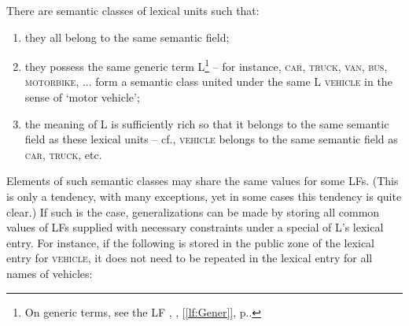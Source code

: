 There are semantic classes of lexical units such that:

\begin{enumerate}

\item they all belong to the same semantic field;

\item they possess the same generic term L\footnote{On generic terms, see the LF , , [\ref{lf:Gener}], p.\thinspace\pageref{lf:Gener}.} -- for instance, \textsc{car}, \textsc{truck}, \textsc{van}, \textsc{bus}, \textsc{motorbike}, ... form a semantic class united under the same L \textsc{vehicle} in the sense of `motor vehicle';

\item the meaning of L is sufficiently rich so that it belongs to the same semantic field as these lexical units -- cf., \textsc{vehicle} belongs to the same semantic field as \textsc{car}, \textsc{truck}, etc.

\end{enumerate}

Elements of such semantic classes may share the same values for some LFs. (This is only a tendency, with many exceptions, yet in some cases this tendency is quite clear.) If such is the case, generalizations can be made by storing all common values of LFs supplied with necessary constraints under a special  of L's lexical entry. For instance, if the following is stored in the public zone of the lexical entry for \textsc{vehicle}, it does not need to be repeated in the lexical entry for all names of vehicles:


